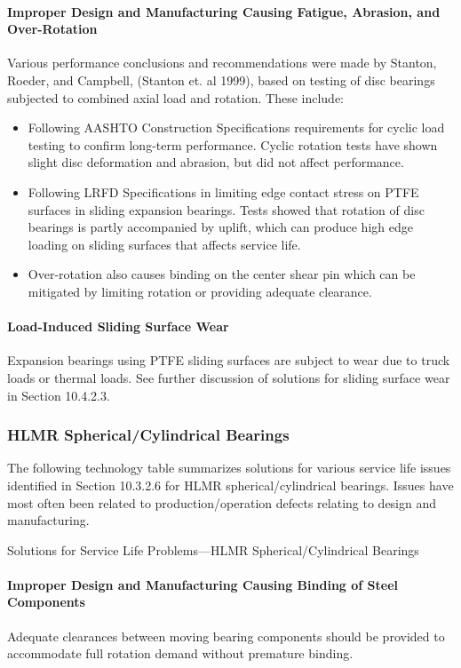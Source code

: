 \paragraph{Improper Design and Manufacturing Causing Fatigue, Abrasion, and Over-Rotation}
Various performance conclusions and recommendations were made by Stanton, Roeder, and Campbell, (Stanton
et. al 1999), based on testing of disc bearings subjected to combined axial load and rotation. These include:
\begin{itemize}
  \item Following AASHTO Construction Specifications requirements for cyclic load testing to confirm long-term
  performance. Cyclic rotation tests have shown slight disc deformation and abrasion, but did not affect
  performance.
  \item Following LRFD Specifications in limiting edge contact stress on PTFE surfaces in sliding expansion
  bearings. Tests showed that rotation of disc bearings is partly accompanied by uplift, which can produce
  high edge loading on sliding surfaces that affects service life.
  \item Over-rotation also causes binding on the center shear pin which can be mitigated by limiting rotation or
  providing adequate clearance.
\end{itemize}
\paragraph{Load-Induced Sliding Surface Wear}
Expansion bearings using PTFE sliding surfaces are subject to wear due to truck loads or thermal loads. See
further discussion of solutions for sliding surface wear in Section 10.4.2.3.

\subsubsection{HLMR Spherical/Cylindrical Bearings}
The following technology table summarizes solutions for various service life issues identified in Section 10.3.2.6
for HLMR spherical/cylindrical bearings. Issues have most often been related to production/operation defects
relating to design and manufacturing.

\begin{table}
  \caption{Solutions for Service Life Problems—HLMR Spherical/Cylindrical Bearings}\label{tab:solution-bearing-spherical}
\end{table}

\paragraph{Improper Design and Manufacturing Causing Binding of Steel Components}
Adequate clearances between moving bearing components should be provided to accommodate full rotation
demand without premature binding.

